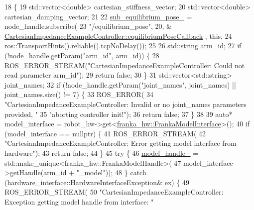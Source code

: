 \begin{DoxyCode}
18                                                                            \{
19   std::vector<double> cartesian\_stiffness\_vector;
20   std::vector<double> cartesian\_damping\_vector;
21 
22   \hyperlink{classfranka__example__controllers_1_1CartesianImpedanceExampleController_a0daa6df50687aeeea370bbf13ed61774}{sub\_equilibrium\_pose\_} = node\_handle.subscribe(
23       \textcolor{stringliteral}{"/equilibrium\_pose"}, 20, &
      \hyperlink{classfranka__example__controllers_1_1CartesianImpedanceExampleController_a84a8c0fb5fbb0c273910d1af68fabe0b}{CartesianImpedanceExampleController::equilibriumPoseCallback}
      , \textcolor{keyword}{this},
24       ros::TransportHints().reliable().tcpNoDelay());
25 
26   \hyperlink{namespacetesting_1_1internal_a8e8ff5b11e64078831112677156cb111}{std::string} arm\_id;
27   \textcolor{keywordflow}{if} (!node\_handle.getParam(\textcolor{stringliteral}{"arm\_id"}, arm\_id)) \{
28     ROS\_ERROR\_STREAM(\textcolor{stringliteral}{"CartesianImpedanceExampleController: Could not read parameter arm\_id"});
29     \textcolor{keywordflow}{return} \textcolor{keyword}{false};
30   \}
31   std::vector<std::string> joint\_names;
32   \textcolor{keywordflow}{if} (!node\_handle.getParam(\textcolor{stringliteral}{"joint\_names"}, joint\_names) || joint\_names.size() != 7) \{
33     ROS\_ERROR(
34         \textcolor{stringliteral}{"CartesianImpedanceExampleController: Invalid or no joint\_names parameters provided, "}
35         \textcolor{stringliteral}{"aborting controller init!"});
36     \textcolor{keywordflow}{return} \textcolor{keyword}{false};
37   \}
38 
39   \textcolor{keyword}{auto}* model\_interface = robot\_hw->get<\hyperlink{classfranka__hw_1_1FrankaModelInterface}{franka\_hw::FrankaModelInterface}>();
40   \textcolor{keywordflow}{if} (model\_interface == \textcolor{keyword}{nullptr}) \{
41     ROS\_ERROR\_STREAM(
42         \textcolor{stringliteral}{"CartesianImpedanceExampleController: Error getting model interface from hardware"});
43     \textcolor{keywordflow}{return} \textcolor{keyword}{false};
44   \}
45   \textcolor{keywordflow}{try} \{
46     \hyperlink{classfranka__example__controllers_1_1CartesianImpedanceExampleController_a588de895d4aaef43c00bc11e6b789084}{model\_handle\_} = std::make\_unique<franka\_hw::FrankaModelHandle>(
47         model\_interface->getHandle(arm\_id + \textcolor{stringliteral}{"\_model"}));
48   \} \textcolor{keywordflow}{catch} (hardware\_interface::HardwareInterfaceException& ex) \{
49     ROS\_ERROR\_STREAM(
50         \textcolor{stringliteral}{"CartesianImpedanceExampleController: Exception getting model handle from interface: "}

\end{DoxyCode}
